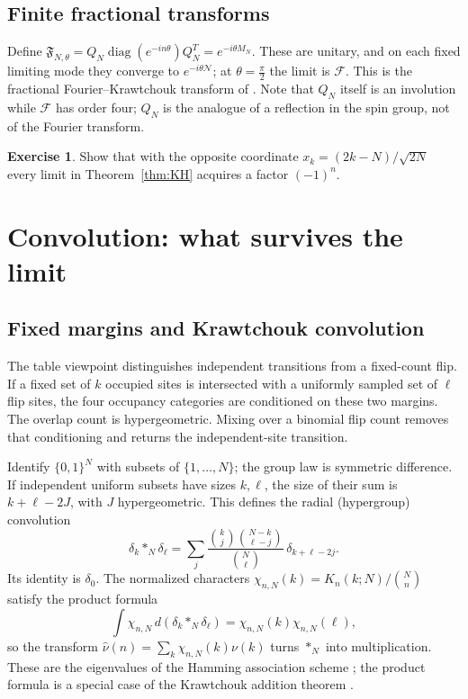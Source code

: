 \documentclass[11pt,reqno]{amsart}
\theoremstyle{definition}
\newtheorem{exercise}[theorem]{Exercise}
\theoremstyle{remark}
\newcommand{\F}{\mathcal F}
\newcommand{\NN}{\mathcal N}
\DeclareMathOperator{\diag}{diag}
\begin{document}
\subsection{Finite fractional transforms}
Define $\mathfrak F_{N,\theta}=Q_N\diag(e^{-in\theta})Q_N^T=e^{-i\theta M_N}$.
These are unitary, and on each fixed limiting mode they converge to
$e^{-i\theta\NN}$; at $\theta=\frac\pi2$ the limit is $\F$. This is the
fractional Fourier--Krawtchouk transform of \cite{AtakishievWolf1997}.
Note that $Q_N$ itself is an involution while $\F$ has order four;
$Q_N$ is the analogue of a reflection in the spin group, not of the
Fourier transform.

\begin{exercise}
Show that with the opposite coordinate $x_k=(2k-N)/\sqrt{2N}$ every
limit in Theorem~\ref{thm:KH} acquires a factor $(-1)^n$.
\end{exercise}

\section{Convolution: what survives the limit}\label{L:conv}

\subsection{Fixed margins and Krawtchouk convolution}
The table viewpoint distinguishes independent transitions from a
fixed-count flip. If a fixed set of $k$ occupied sites is intersected
with a uniformly sampled set of $\ell$ flip sites, the four occupancy
categories are conditioned on these two margins. The overlap count
is hypergeometric. Mixing over a binomial flip count removes that
conditioning and returns the independent-site transition.

Identify $\{0,1\}^N$ with subsets of $\{1,\dots,N\}$; the group law is
symmetric difference. If independent uniform subsets have sizes
$k,\ell$, the size of their sum is $k+\ell-2J$, with $J$ hypergeometric.
This defines the radial (hypergroup) convolution
\begin{equation}\label{eq:hyper}
\delta_k*_N\delta_\ell=\sum_j
\frac{\binom kj\binom{N-k}{\ell-j}}{\binom N\ell}\,\delta_{k+\ell-2j}.
\end{equation}
Its identity is $\delta_0$. The normalized characters
$\chi_{n,N}(k)=K_n(k;N)/\binom Nn$ satisfy the product formula
\begin{equation}\label{eq:char}
\int\chi_{n,N}\,d(\delta_k*_N\delta_\ell)=\chi_{n,N}(k)\chi_{n,N}(\ell),
\end{equation}
so the transform $\widehat\nu(n)=\sum_k\chi_{n,N}(k)\nu(k)$ turns $*_N$
into multiplication. These are the eigenvalues of the Hamming
association scheme \cite{Delsarte1973,MacWilliamsSloane1977}; the
product formula is a special case of the Krawtchouk addition theorem
\cite{Dunkl1976}.
\end{document}
